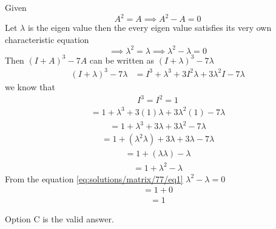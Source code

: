 
Given
\begin{equation}
 A^2 = A \implies A^2 - A = 0 
\end{equation}
Let $\lambda $ is the eigen value then the every eigen value satisfies its very own characteristic equation
\begin{equation}\label{eq:solutions/matrix/77/eq1}
\implies  \lambda^2 = \lambda  \implies  \lambda^2 - \lambda = 0 
\end{equation}
Then $ (I+A)^3 - 7A $ can be written as $ (I+\lambda)^3 - 7\lambda $\\
\begin{align}
 (I+\lambda)^3 - 7\lambda &  = I^3+\lambda^3+3I^2\lambda+3\lambda^2I - 7\lambda
\end{align}
we know that 
\begin{align}	
I^3 = I^2 = 1
\end{align}
\begin{align}
   = 1+\lambda^3+3(1)\lambda+3\lambda^2(1)-7\lambda
\end{align}
\begin{align}
  = 1+\lambda^3+3\lambda+3\lambda^2-7\lambda
\end{align}
\begin{align}
    = 1+(\lambda^2\lambda)+3\lambda+3\lambda -7\lambda
\end{align}
\begin{align}
     = 1+(\lambda\lambda)-\lambda
\end{align}
\begin{align}
 = 1+\lambda^2-\lambda
\end{align}
From the equation \eqref{eq:solutions/matrix/77/eq1}  $ \lambda^2-\lambda = 0 $
\begin{align}
     = 1+0
\end{align}
\begin{align}
     = 1
\end{align}

Option C is the valid answer.


 


  
